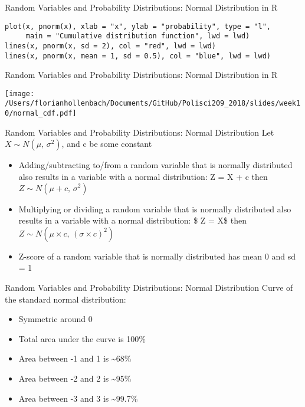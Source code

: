 \documentclass[presentation]{beamer}
\begin{document}
\begin{frame}[fragile,shrink=30,label={sec:org40a1483}]{Random Variables and Probability Distributions: Normal Distribution in R}
 \begin{verbatim}
plot(x, pnorm(x), xlab = "x", ylab = "probability", type = "l",
     main = "Cumulative distribution function", lwd = lwd)
lines(x, pnorm(x, sd = 2), col = "red", lwd = lwd)
lines(x, pnorm(x, mean = 1, sd = 0.5), col = "blue", lwd = lwd)
\end{verbatim}
\end{frame}


\begin{frame}[label={sec:orga1dd776}]{Random Variables and Probability Distributions: Normal Distribution in R}
\begin{center}
\texttt{[image: /Users/florianhollenbach/Documents/GitHub/Polisci209\_2018/slides/week10/normal\_cdf.pdf]}
\end{center}
\end{frame}


\begin{frame}[label={sec:orgbb0acf4}]{Random Variables and Probability Distributions: Normal Distribution}
Let \(X \sim N(\mu,\,\sigma^{2})\), and c be some constant

\begin{itemize}
\item Adding/subtracting to/from a random variable that is normally distributed also results in a variable with a normal distribution:
Z = X + c then \(Z \sim N(\mu +c,\,\sigma^{2})\)
\end{itemize}

\pause


\begin{itemize}
\item Multiplying or dividing a random variable that is normally distributed also results in a variable with a normal distribution:
\$ Z = X\timesc\$ then \(Z  \sim N(\mu \times c,\,(\sigma \times c)^{2})\)

\item Z-score of a random variable that is normally distributed has mean 0 and sd = 1
\end{itemize}
\end{frame}


\begin{frame}[label={sec:orgaa51d8a}]{Random Variables and Probability Distributions: Normal Distribution}
Curve of the standard normal distribution:

\begin{itemize}
\item Symmetric around 0
\item Total area under the curve is 100\%
\item Area between -1 and 1 is \textasciitilde{}68\%
\item Area between -2 and 2 is \textasciitilde{}95\%
\item Area between -3 and 3 is \textasciitilde{}99.7\%
\end{itemize}
\end{frame}
\end{document}
